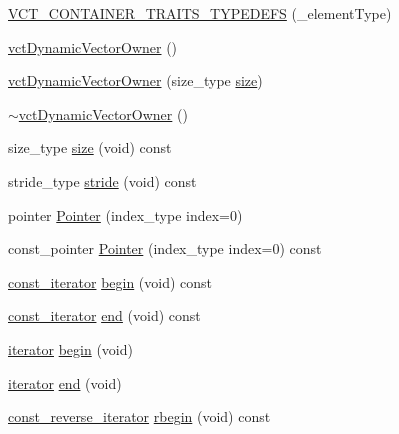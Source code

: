 \begin{DoxyCompactItemize}
\item 
\hyperlink{classvct_dynamic_vector_owner_aad50327e7c7be01742646b1531bf9097}{V\-C\-T\-\_\-\-C\-O\-N\-T\-A\-I\-N\-E\-R\-\_\-\-T\-R\-A\-I\-T\-S\-\_\-\-T\-Y\-P\-E\-D\-E\-F\-S} (\-\_\-element\-Type)
\item 
\hyperlink{classvct_dynamic_vector_owner_aa31c2ead5f0f418224b594d74b88c015}{vct\-Dynamic\-Vector\-Owner} ()
\item 
\hyperlink{classvct_dynamic_vector_owner_a9c9cc10064a82cf050b0d8188dbb0f19}{vct\-Dynamic\-Vector\-Owner} (size\-\_\-type \hyperlink{classvct_dynamic_vector_owner_a6a2cc98b79ff181f755df05a8d45780a}{size})
\item 
\hyperlink{classvct_dynamic_vector_owner_a5905281268660dc7690b706d6505b9ef}{$\sim$vct\-Dynamic\-Vector\-Owner} ()
\item 
size\-\_\-type \hyperlink{classvct_dynamic_vector_owner_a6a2cc98b79ff181f755df05a8d45780a}{size} (void) const 
\item 
stride\-\_\-type \hyperlink{classvct_dynamic_vector_owner_ab97de545039cf02d9b4f4a7d251731af}{stride} (void) const 
\item 
pointer \hyperlink{classvct_dynamic_vector_owner_a8359c5db66a863647fca1531896311b7}{Pointer} (index\-\_\-type index=0)
\item 
const\-\_\-pointer \hyperlink{classvct_dynamic_vector_owner_a7490d50d02a9ddcdc7e4708dea981560}{Pointer} (index\-\_\-type index=0) const 
\item 
\hyperlink{classvct_dynamic_vector_owner_a607608d191422c1d82168ffecd37c853}{const\-\_\-iterator} \hyperlink{classvct_dynamic_vector_owner_a9e677b14c7878736b9255530e606c879}{begin} (void) const 
\item 
\hyperlink{classvct_dynamic_vector_owner_a607608d191422c1d82168ffecd37c853}{const\-\_\-iterator} \hyperlink{classvct_dynamic_vector_owner_af49debdda491963852103e4fc5bb3c5b}{end} (void) const 
\item 
\hyperlink{classvct_dynamic_vector_owner_a0ef55f887d1340204d64f21d4db08fad}{iterator} \hyperlink{classvct_dynamic_vector_owner_a16e3e221073c79a07ea58bfb402a9380}{begin} (void)
\item 
\hyperlink{classvct_dynamic_vector_owner_a0ef55f887d1340204d64f21d4db08fad}{iterator} \hyperlink{classvct_dynamic_vector_owner_a9912928e7dadb432f157932fccd914d1}{end} (void)
\item 
\hyperlink{classvct_dynamic_vector_owner_ab157dd93c9061bb74e4a5983606e200a}{const\-\_\-reverse\-\_\-iterator} \hyperlink{classvct_dynamic_vector_owner_a0c4d0abbf9a438ffae1c3a5cf7877469}{rbegin} (void) const 

\end{DoxyCompactItemize}
